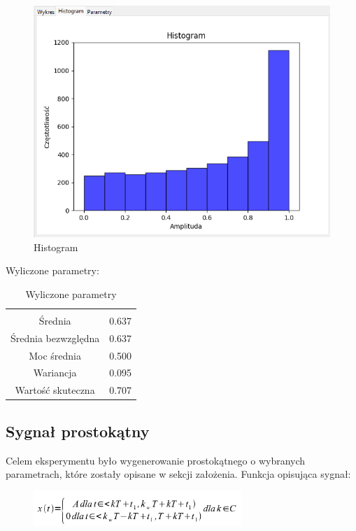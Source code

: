 \documentclass{article}
\begin{document}
\begin{figure}[h!]
    \centering
    \includegraphics[width=\textwidth]{img/sinus-dwu/hist.png}
    \caption{Histogram}
\end{figure}
\FloatBarrier
Wyliczone parametry:
\begin{table}[h!]
    \centering
    \vspace{0.2cm}
    \begin{tabular}{|c|c|}
        \hline\hline\\[-0.4cm]
        Średnia & 0.637  \\
        \hline
        Średnia bezwzględna & 0.637  \\
        \hline
        Moc średnia & 0.500  \\
        \hline
        Wariancja & 0.095 \\
        \hline
        Wartość skuteczna & 0.707 \\
        \hline
    \end{tabular}
    \caption{Wyliczone parametry}
    \label{sinusdwupolowkowy}
\end{table}

\subsection{Sygnał prostokątny} \label{prostokat} 
Celem eksperymentu było wygenerowanie prostokątnego o wybranych parametrach,
które zostały opisane w sekcji założenia. Funkcja opisująca sygnał:

\begin{figure}[!htbp]
    \centering
    \includegraphics[width=0.7\textwidth]{img/prostokat.png}
\end{figure}
\end{document}
